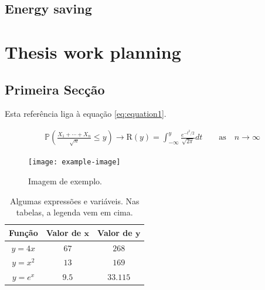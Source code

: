 \documentclass[english]{ist-thesis}
\begin{document}
\section{Energy saving}

\chapter{Thesis work planning}

\section{Primeira Secção}

Esta referência liga à equação \eqref{eq:equation1}.

\begin{gather}\label{eq:equation1}
	\mathbb{P}\left(\frac{X_1 + \cdots + X_n}{\sqrt{n}} \leq y\right) \rightarrow \mathrm{R}(y) = \int_{-\infty}^{y} \frac{e^{-t^2/2}}{\sqrt{2\pi}}dt \qquad \mathrm{as} \quad n \rightarrow \infty
\end{gather}

\begin{figure}[ht]
	\centering
	\texttt{[image: example-image]}
	\caption{Imagem de exemplo.}
	\label{fig:image1}
\end{figure}

\lipsum[1] %

\begin{table}[ht]
	\centering
	\caption{Algumas expressões e variáveis. Nas tabelas, a legenda vem em cima.}
	\begin{tabular}{c c c}\toprule
		\textbf{Função}		& \textbf{Valor de $\mathbf{x}$}	& \textbf{Valor de $\mathbf{y}$}\\
		\midrule
		$y = 4x$			& $67$								& $268$							\\
		$y = x^2$			& $13$								& $169$							\\
		$y = e^x$			& $9.5$								& $33.115$						\\
		\bottomrule
	\end{tabular}
	\label{tab:tab1}
\end{table}

\lipsum[11] %
\end{document}
